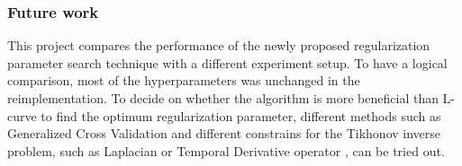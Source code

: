 \documentclass[draftcls, onecolumn, journal]{IEEEtran}
\begin{document}
\subsubsection{Future work}
This project compares the performance of the newly proposed regularization parameter search technique with a different experiment setup. To have a logical comparison, most of the hyperparameters was unchanged in the reimplementation. To decide on whether the algorithm is more beneficial than L-curve to find the optimum regularization parameter, different methods such as Generalized Cross Validation and different constrains for the Tikhonov inverse problem, such as Laplacian or Temporal Derivative operator \cite{milanivc2014assessment}, can be tried out. 


\printbibliography
\end{document}
